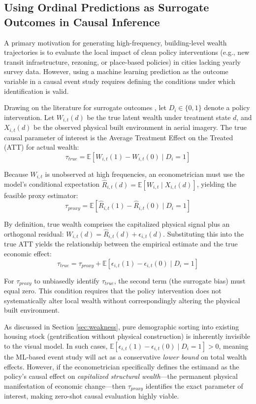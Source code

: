 \subsection{Using Ordinal Predictions as Surrogate Outcomes in Causal Inference}
\label{sec:surrogate_causal}

A primary motivation for generating high-frequency, building-level wealth trajectories is to evaluate the local impact of clean policy interventions (e.g., new transit infrastructure, rezoning, or place-based policies) in cities lacking yearly survey data. However, using a machine learning prediction as the outcome variable in a causal event study requires defining the conditions under which identification is valid. 

Drawing on the literature for surrogate outcomes \citep{athey2019surrogate}, let $D_i \in \{0,1\}$ denote a policy intervention. Let $W_{i,t}(d)$ be the true latent wealth under treatment state $d$, and $X_{i,t}(d)$ be the observed physical built environment in aerial imagery. The true causal parameter of interest is the Average Treatment Effect on the Treated (ATT) for actual wealth:
\begin{equation}
    \tau_{true} = \mathbb{E}\left[ W_{i,t}(1) - W_{i,t}(0) \mid D_i = 1 \right]
\end{equation}

Because $W_{i,t}$ is unobserved at high frequencies, an econometrician must use the model's conditional expectation $\hat{R}_{i,t}(d) = \mathbb{E}[W_{i,t} \mid X_{i,t}(d)]$, yielding the feasible proxy estimator:
\begin{equation}
    \tau_{proxy} = \mathbb{E}\left[ \hat{R}_{i,t}(1) - \hat{R}_{i,t}(0) \mid D_i = 1 \right]
\end{equation}

By definition, true wealth comprises the capitalized physical signal plus an orthogonal residual: $W_{i,t}(d) = \hat{R}_{i,t}(d) + \epsilon_{i,t}(d)$. Substituting this into the true ATT yields the relationship between the empirical estimate and the true economic effect:
\begin{equation}
    \tau_{true} = \tau_{proxy} + \mathbb{E}\left[ \epsilon_{i,t}(1) - \epsilon_{i,t}(0) \mid D_i = 1 \right]
\end{equation}

For $\tau_{proxy}$ to unbiasedly identify $\tau_{true}$, the second term (the surrogate bias) must equal zero. This condition requires that the policy intervention does not systematically alter local wealth without correspondingly altering the physical built environment. 

As discussed in Section \ref{sec:weakness}, pure demographic sorting into existing housing stock (gentrification without physical construction) is inherently invisible to the visual model. In such cases, $\mathbb{E}[\epsilon_{i,t}(1) - \epsilon_{i,t}(0) \mid D_i = 1] > 0$, meaning the ML-based event study will act as a conservative \textit{lower bound} on total wealth effects. However, if the econometrician specifically defines the estimand as the policy's causal effect on \textit{capitalized structural wealth}---the permanent physical manifestation of economic change---then $\tau_{proxy}$ identifies the exact parameter of interest, making zero-shot causal evaluation highly viable.